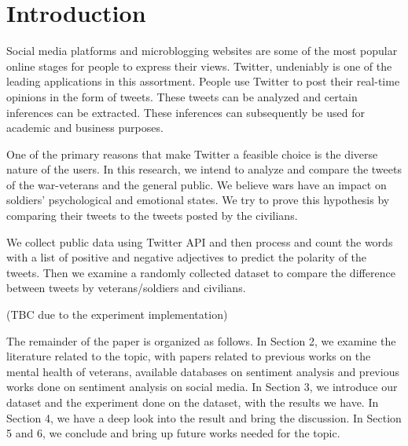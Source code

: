 \section{Introduction}

Social media platforms and microblogging websites are some of the most popular
online stages for people to express their views. Twitter, undeniably is one of
the leading applications in this assortment. People use Twitter to post their
real-time opinions in the form of tweets. These tweets can be analyzed and
certain inferences can be extracted. These inferences can subsequently be used
for academic and business purposes.

One of the primary reasons that make Twitter a feasible choice is the diverse
nature of the users. In this research, we intend to analyze and compare the
tweets of the war-veterans and the general public. We believe wars have an
impact on soldiers’ psychological and emotional states. We try to prove this
hypothesis by comparing their tweets to the tweets posted by the civilians.

We collect public data using Twitter API and then process and count the words
with a list of positive and negative adjectives to predict the polarity of the
tweets. Then we examine a randomly collected dataset to compare the difference
between tweets by veterans/soldiers and civilians.

(TBC due to the experiment implementation)

The remainder of the paper is organized as follows. In Section 2, we examine
the literature related to the topic, with papers related to previous works on
the mental health of veterans, available databases on sentiment analysis and
previous works done on sentiment analysis on social media. In Section 3, we
introduce our dataset and the experiment done on the dataset, with the results
we have. In Section 4, we have a deep look into the result and bring the
discussion. In Section 5 and 6, we conclude and bring up future works needed
for the topic.
